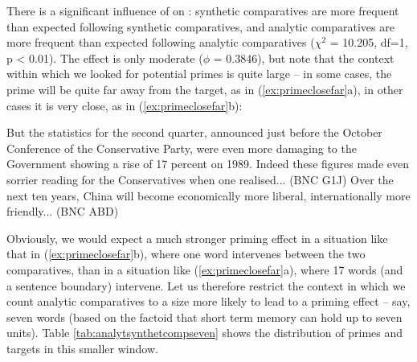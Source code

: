There is a significant influence of  on : synthetic comparatives are more frequent than expected following synthetic comparatives, and analytic comparatives are more frequent than expected following analytic comparatives ($\chi^2$ = 10.205, df=1, p < 0.01). The effect is only moderate ($\phi$ = 0.3846), but note that the context within which we looked for potential primes is quite large -- in some cases, the prime will be quite far away from the target, as in (\ref{ex:primeclosefar}a), in other cases it is very close, as in (\ref{ex:primeclosefar}b):

\begin{exe}
\ex
\begin{xlist} 
\label{ex:primeclosefar}
\ex But the statistics for the second quarter, announced just before the October Conference of the Conservative Party, were even more damaging to the Government showing a rise of 17 percent on 1989. Indeed these figures made even sorrier reading for the Conservatives when one realised... (BNC G1J)
\ex Over the next ten years, China will become economically more liberal, internationally more friendly... (BNC ABD)
\end{xlist}
\end{exe}

Obviously, we would expect a much stronger priming effect in a situation like that in (\ref{ex:primeclosefar}b), where one word intervenes between the two comparatives, than in a situation like (\ref{ex:primeclosefar}a), where 17 words (and a sentence boundary) intervene. Let us therefore restrict the context in which we count analytic comparatives to a size more likely to lead to a priming effect -- say, seven words (based on the factoid that short term memory can hold up to seven units). Table \ref{tab:analytsynthetcompseven} shows the distribution of primes and targets in this smaller window.

